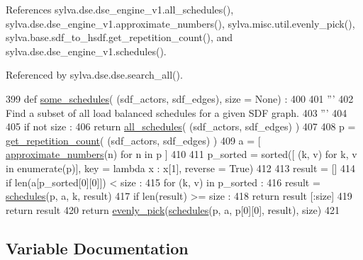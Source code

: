 References sylva.\+dse.\+dse\+\_\+engine\+\_\+v1.\+all\+\_\+schedules(), sylva.\+dse.\+dse\+\_\+engine\+\_\+v1.\+approximate\+\_\+numbers(), sylva.\+misc.\+util.\+evenly\+\_\+pick(), sylva.\+base.\+sdf\+\_\+to\+\_\+hsdf.\+get\+\_\+repetition\+\_\+count(), and sylva.\+dse.\+dse\+\_\+engine\+\_\+v1.\+schedules().



Referenced by sylva.\+dse.\+dse.\+search\+\_\+all().


\begin{DoxyCode}
399 \textcolor{keyword}{def }\hyperlink{namespacesylva_1_1dse_1_1dse__engine__v1_a4a316401cfa961e555596115afe86b4c}{some\_schedules}( (sdf\_actors, sdf\_edges), size = \textcolor{keywordtype}{None}) :
400 
401   \textcolor{stringliteral}{'''}
402 \textcolor{stringliteral}{    Find a subset of all load balanced schedules for a given SDF graph.}
403 \textcolor{stringliteral}{  '''}
404 
405   \textcolor{keywordflow}{if} \textcolor{keywordflow}{not} size :
406     \textcolor{keywordflow}{return} \hyperlink{namespacesylva_1_1dse_1_1dse__engine__v1_a8ca06c203c74d5cd06866a67203d251c}{all\_schedules}( (sdf\_actors, sdf\_edges) )
407 
408   p = \hyperlink{namespacesylva_1_1base_1_1sdf__to__hsdf_a9c5d04cd8f0b409b56239871067f50d5}{get\_repetition\_count}( (sdf\_actors, sdf\_edges) )
409   a = [ \hyperlink{namespacesylva_1_1dse_1_1dse__engine__v1_ad6e97d4396aee376d84b0ce79ba7fd22}{approximate\_numbers}(n) \textcolor{keywordflow}{for} n \textcolor{keywordflow}{in} p ]
410 
411   p\_sorted = sorted([ (k, v) \textcolor{keywordflow}{for} k, v \textcolor{keywordflow}{in} enumerate(p)], key = \textcolor{keyword}{lambda} x : x[1], reverse = \textcolor{keyword}{True})
412 
413   result = []
414   \textcolor{keywordflow}{if} len(a[p\_sorted[0][0]]) < size :
415     \textcolor{keywordflow}{for} (k, v) \textcolor{keywordflow}{in} p\_sorted :
416       result = \hyperlink{namespacesylva_1_1dse_1_1dse__engine__v1_a9f62832c5ef72269c1920b61d0eeb2a6}{schedules}(p, a, k, result)
417       \textcolor{keywordflow}{if} len(result) >= size :
418         \textcolor{keywordflow}{return} result [:size]
419     \textcolor{keywordflow}{return} result
420   \textcolor{keywordflow}{return} \hyperlink{namespacesylva_1_1misc_1_1util_a0881116abd7a50c6cd552b6b3edafea3}{evenly\_pick}(\hyperlink{namespacesylva_1_1dse_1_1dse__engine__v1_a9f62832c5ef72269c1920b61d0eeb2a6}{schedules}(p, a, p[0][0], result), size)
421 
\end{DoxyCode}


\subsection{Variable Documentation}
\mbox{\label{namespacesylva_1_1dse_1_1dse__engine__v1_a43b259fb54860365fe18c9efa8847022}} 
